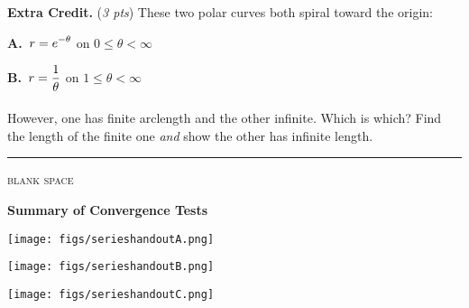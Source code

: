 \documentclass[11pt]{amsart}
\newcommand{\ds}{\displaystyle}
\newcommand{\prob}[1]{\bigskip\noindent\textbf{#1.} }
\newcommand{\pts}[1]{(\emph{#1 pts})}
\newcommand{\probpts}[2]{\prob{#1} \pts{#2} \quad}
\begin{document}
\clearpage\newpage
\probpts{Extra Credit}{3}  These two polar curves both spiral toward the origin:

\medskip
\textbf{A.\,} $\ds \strut r=e^{-\theta}$ on $0\le \theta < \infty$

\medskip
\textbf{B.\,} $\ds r = \frac{1}{\strut\theta}$ on $1\le \theta < \infty$

\noindent However, one has finite arclength and the other infinite.  Which is which?  Find the length of the finite one \emph{and} show the other has infinite length.
\vfill

\noindent \hrule
\begin{center}
\small
\bigskip
\textsc{blank space}
\end{center}
\vspace{3.0in}


\clearpage\newpage
\large\centerline{\textbf{Summary of Convergence Tests}}
\normalsize

\begin{center}
\texttt{[image: figs/serieshandoutA.png]}
\end{center}
\vfill


\clearpage\newpage
\begin{center}
\texttt{[image: figs/serieshandoutB.png]}

\vspace{-2mm}
\texttt{[image: figs/serieshandoutC.png]}
\end{center}
\vfill
\end{document}
